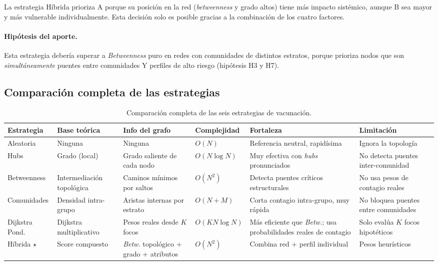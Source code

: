 \documentclass[spanish,notitlepage,letterpaper, 12pt]{article}
\begin{document}
La estrategia H\'ibrida prioriza A porque su posici\'on en la red (\textit{betweenness} y grado altos) tiene m\'as impacto sist\'emico, aunque B sea mayor y m\'as vulnerable individualmente. Esta decisi\'on solo es posible gracias a la combinaci\'on de los cuatro factores.

\paragraph{Hip\'otesis del aporte.} Esta estrategia deber\'ia superar a \textit{Betweenness} puro en redes con comunidades de distintos estratos, porque prioriza nodos que son \emph{simult\'aneamente} puentes entre comunidades Y perfiles de alto riesgo (hip\'otesis H3 y H7).

\subsection{Comparaci\'on completa de las estrategias}

\begin{table}[H]
\centering
\scriptsize
\caption{Comparaci\'on completa de las seis estrategias de vacunaci\'on.}
\label{tab:comparacion_estrategias}
\begin{tabularx}{\textwidth}{l X X l X X}
\toprule
\textbf{Estrategia} & \textbf{Base te\'orica} & \textbf{Info del grafo} & \textbf{Complejidad} & \textbf{Fortaleza} & \textbf{Limitaci\'on} \\
\midrule
Aleatoria & Ninguna & Ninguna & $O(N)$ & Referencia neutral, rapid\'isima & Ignora la topolog\'ia \\
\addlinespace
Hubs & Grado (local) & Grado saliente de cada nodo & $O(N \log N)$ & Muy efectiva con \textit{hubs} pronunciados & No detecta puentes inter-comunidad \\
\addlinespace
Betweenness & Intermediaci\'on topol\'ogica & Caminos m\'inimos por saltos & $O(N^2)$ & Detecta puentes cr\'iticos estructurales & No usa pesos de contagio reales \\
\addlinespace
Comunidades & Densidad intra-grupo & Aristas internas por estrato & $O(N+M)$ & Corta contagio intra-grupo, muy r\'apida & No bloquea puentes entre comunidades \\
\addlinespace
Dijkstra Pond. & Dijkstra multiplicativo & Pesos reales desde $K$ focos & $O(K N \log N)$ & M\'as eficiente que \textit{Betw.}; usa probabilidades reales de contagio & Solo eval\'ua $K$ focos hipot\'eticos \\
\addlinespace
H\'ibrida $\star$ & Score compuesto & \textit{Betw.} topol\'ogico + grado + atributos & $O(N^2)$ & Combina red + perfil individual & Pesos heur\'isticos \\
\bottomrule
\end{tabularx}
\end{table}
\end{document}
